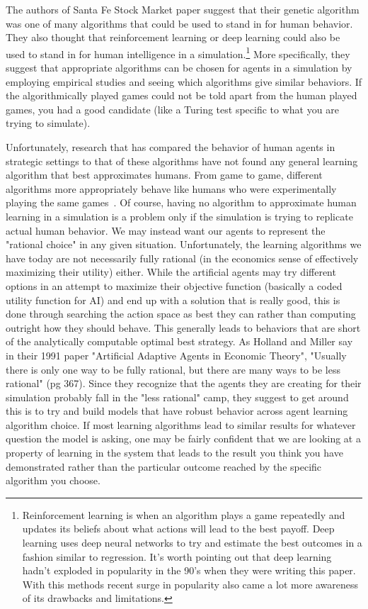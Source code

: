 \documentclass[12pt,twoside]{reedthesis}
\begin{document}
The authors of Santa Fe Stock Market paper suggest that their genetic algorithm was one of many algorithms that could be used to stand in for human behavior. They also thought that reinforcement learning or deep learning could also be used to stand in for human intelligence in a simulation.\footnote{Reinforcement learning is when an algorithm plays a game repeatedly and updates its beliefs about what actions will lead to the best payoff. Deep learning uses deep neural networks to try and estimate the best outcomes in a fashion similar to regression. It's worth pointing out that deep learning hadn't exploded in popularity in the 90's when they were writing this paper. With this methods recent surge in popularity also came a lot more awareness of its drawbacks and limitations.} More specifically, they suggest that appropriate algorithms can be chosen for agents in a simulation by employing empirical studies and seeing which algorithms give similar behaviors. If the algorithmically played games could not be told apart from the human played games, you had a good candidate (like a Turing test specific to what you are trying to simulate)\citep{Arthur1991}. 

Unfortunately, research that has compared the behavior of human agents in strategic settings to that of these algorithms have not found any general learning algorithm that best approximates humans. From game to game, different algorithms more appropriately behave like humans who were experimentally playing the same games~\citep{Tesfatsion2002}. Of course, having no algorithm to approximate human learning in a simulation is a problem only if the simulation is trying to replicate actual human behavior. We may instead want our agents to represent the "rational choice" in any given situation. Unfortunately, the learning algorithms we have today are not necessarily fully rational (in the economics sense of effectively maximizing their utility) either. While the artificial agents may try different options in an attempt to maximize their objective function (basically a coded utility function for AI) and end up with a solution that is really good, this is done through searching the action space as best they can rather than computing outright how they should behave. This generally leads to behaviors that are short of the analytically computable optimal best strategy. As Holland and Miller say in their 1991 paper "Artificial Adaptive Agents in Economic Theory", "Usually there is only one way to be fully rational, but there are many ways to be less rational" (pg 367). Since they recognize that the agents they are creating for their simulation probably fall in the "less rational" camp, they suggest to get around this is to try and build models that have robust behavior across agent learning algorithm choice. If most learning algorithms lead to similar results for whatever question the model is asking, one may be fairly confident that we are looking at a property of learning in the system that leads to the result you think you have demonstrated rather than the particular outcome reached by the specific algorithm you choose.
\end{document}
